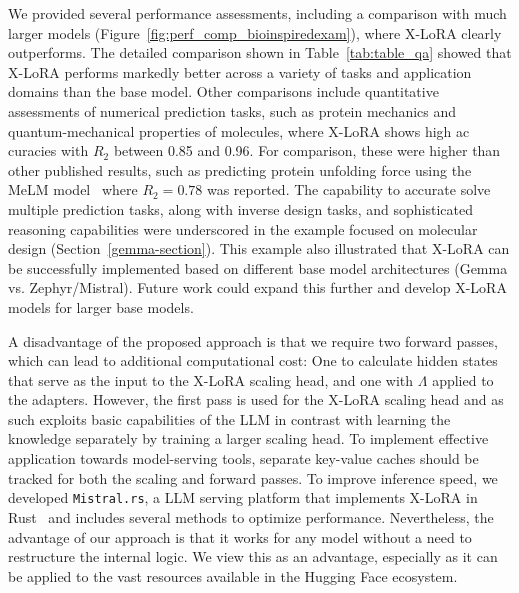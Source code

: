 We provided several performance assessments, including a comparison with much larger models (Figure~\ref{fig:perf_comp_bioinspiredexam}), where X-LoRA clearly outperforms. The detailed comparison shown in Table~\ref{tab:table_qa} showed that X-LoRA performs markedly better across a variety of tasks and application domains than the base model. Other comparisons include quantitative assessments of numerical prediction tasks, such as protein mechanics and quantum-mechanical properties of molecules, where X-LoRA shows high ac curacies with $R_2$ between 0.85 and 0.96. For comparison, these were higher than other published results, such as predicting protein unfolding force using the MeLM model~\cite{Buehler2023MeLMProblemsb} where  $R_2=0.78$ was reported. The capability to accurate solve multiple prediction tasks, along with inverse design tasks, and sophisticated reasoning capabilities were underscored in the example focused on molecular design (Section~\ref{gemma-section}). This example also illustrated that X-LoRA can be successfully implemented based on different base model architectures (Gemma vs. Zephyr/Mistral). Future work could expand this further and develop X-LoRA models for larger base models. 
 
A disadvantage of the proposed approach is that we require two forward passes, which can lead to additional computational cost: One to calculate hidden states that serve as the input to the X-LoRA scaling head, and one with $\Lambda$ applied to the adapters. However, the first pass is used for the X-LoRA scaling head and as such exploits basic capabilities of the LLM in contrast with learning the knowledge separately by training a larger scaling head. To implement effective application towards model-serving tools, separate key-value caches should be tracked for both the scaling and forward passes. To improve inference speed, we developed \texttt{Mistral.rs}, a LLM serving platform that implements X-LoRA in Rust~\cite{matsakis2014rust} and includes several methods to optimize performance. Nevertheless, the advantage of our approach is that it works for any model without a need to restructure the internal logic. We view this as an advantage, especially as it can be applied to the vast resources available in the Hugging Face ecosystem.

